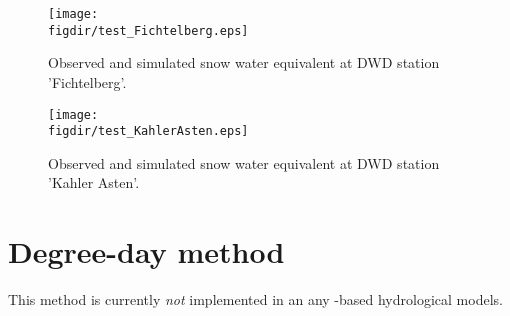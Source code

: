 \begin{figure*}
  \texttt{[image: \\figdir/test\_Fichtelberg.eps]}
  \caption{Observed and simulated snow water equivalent at DWD station 'Fichtelberg'. \label{fig:snow-enBal_test-Fichtelberg}}
\end{figure*}

\begin{figure*}
  \texttt{[image: \\figdir/test\_KahlerAsten.eps]}
  \caption{Observed and simulated snow water equivalent at DWD station 'Kahler Asten'. \label{fig:snow-enBal_test-KahlerAsten}}
\end{figure*}



\section{Degree-day method} \label{sec:snow-degDay}

This method is currently \emph{not} implemented in an any -based hydrological models.




